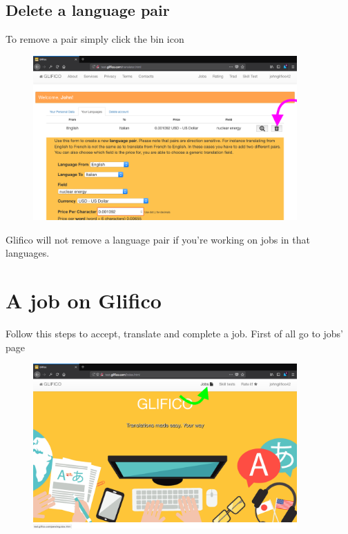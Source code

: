 \documentclass[11 pt, a4paper]{article}
\begin{document}
\clearpage
\subsection{Delete a language pair}
To remove a pair simply click the bin icon
\begin{figure}[H]
\centering
\includegraphics[width=0.9\textwidth]{translator_pair8.png}
\end{figure}

Glifico will not remove a language pair if you're working on jobs in that languages.

\clearpage
\section{A job on Glifico}
Follow this steps to accept, translate and complete a job.
First of all go to jobs' page
\begin{figure}[H]
\centering
\includegraphics[width=0.9\textwidth]{translator_job0.png}
\end{figure}
\end{document}
